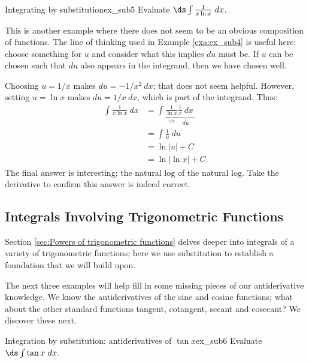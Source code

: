 \begin{example}{Integrating by substitution}{ex_sub5}
Evaluate $\ds \int \frac{1}{x\ln x}\ dx$.
\end{example}

\begin{solution}
{This is another example where there does not seem to be an obvious composition of functions. The line of thinking used in Example \ref{exa:ex_sub4} is useful here: choose something for $u$ and consider what this implies $du$ must be. If $u$ can be chosen such that $du$ also appears in the integrand, then we have chosen well.

Choosing $u = 1/x$ makes $du = -1/x^2\ dx$; that does not seem helpful. However, setting $u = \ln x$ makes $du = 1/x\ dx$, which is part of the integrand. Thus:
\begin{align*}
	\int \frac1{x\ln x}\ dx 	&=	\int \frac{1}{\underbrace{\ln x}_{1/u}}\underbrace{\frac1x\ dx}_{du} \\
												&= \int \frac1u\ du \\
												&= \ln |u| + C \\
												&= \ln | \ln x| + C.
\end{align*}
The final answer is interesting; the natural log of the natural log. Take the derivative to confirm this answer is indeed correct.
}
\end{solution}

\subsection{Integrals Involving Trigonometric Functions}

Section \ref{sec:Powers of trigonometric functions} delves deeper into integrals of a variety of trigonometric functions; here we use substitution to establish a foundation that we will build upon. 

The next three examples will help fill in some missing pieces of our antiderivative knowledge. We know the antiderivatives of the sine and cosine functions; what about the other standard functions tangent, cotangent, secant and cosecant? We discover these next.\\

\begin{example}{Integration by substitution: antiderivatives of $\tan x$}{ex_sub6}
Evaluate $\ds \int \tan x\ dx.$
\end{example}

